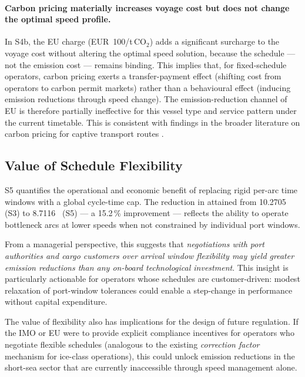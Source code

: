 \paragraph{Carbon pricing materially increases voyage cost but does not
change the optimal speed profile.}
In S4b, the EU \ETS{} charge (EUR~100/t\,CO$_2$) adds a significant
surcharge to the voyage cost without altering the optimal speed solution,
because the schedule --- not the emission cost --- remains binding.  This
implies that, for fixed-schedule operators, carbon pricing exerts a
transfer-payment effect (shifting cost from operators to carbon permit
markets) rather than a behavioural effect (inducing emission reductions
through speed change).  The emission-reduction channel of EU \ETS{} is
therefore partially ineffective for this vessel type and service pattern
under the current timetable.  This is consistent with findings in the
broader literature on carbon pricing for captive transport routes
\parencite{kontovas2011}.

\subsection{Value of Schedule Flexibility}
\label{sec:disc:flexibility}

S5 quantifies the operational and economic benefit of replacing rigid
per-arc time windows with a global cycle-time cap.  The reduction in
attained \CII{} from 10.2705~\gGTnm{} (S3) to 8.7116~\gGTnm{} (S5)
--- a 15.2\,\% improvement --- reflects the ability to operate bottleneck
arcs at lower speeds when not constrained by individual port windows.

From a managerial perspective, this suggests that \emph{negotiations
with port authorities and cargo customers over arrival window flexibility
may yield greater emission reductions than any on-board technological
investment}.  This insight is particularly actionable for \RoRo{}
operators whose schedules are customer-driven: modest relaxation of
port-window tolerances could enable a step-change in \CII{} performance
without capital expenditure.

The value of flexibility also has implications for the design of future
\CII{} regulation.  If the IMO or EU were to provide explicit compliance
incentives for operators who negotiate flexible schedules (analogous to
the existing \textit{correction factor} mechanism for ice-class
operations), this could unlock emission reductions in the short-sea
sector that are currently inaccessible through speed management alone.

